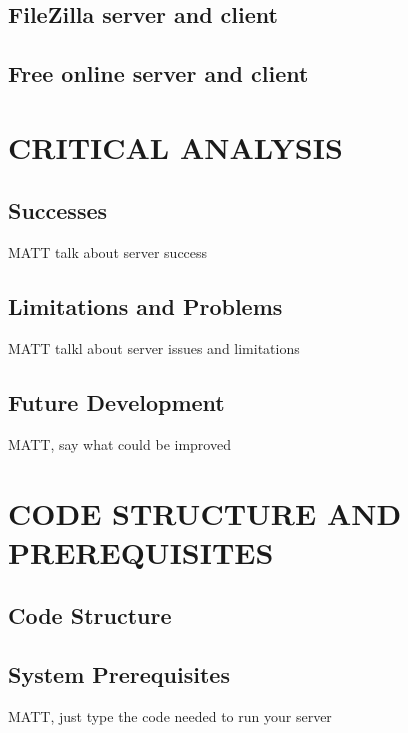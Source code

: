 \documentclass[10pt,twocolumn]{witseiepaper}
\begin{document}
\subsection{FileZilla server and client}
\label{sec: Results FileZilla}


\subsection{Free online server and client}
\label{sec: Results Online}


%
\section{CRITICAL ANALYSIS}
\label{sec: Critical Analysis}

\subsection{Successes}
\label{sec: Successes}
MATT talk about server success

\subsection{Limitations and Problems}
\label{sec: Limitations and Problems}
MATT talkl about server issues and limitations

\subsection{Future Development}
\label{sec: Future Development}
MATT, say what could be improved


%
\section{CODE STRUCTURE AND PREREQUISITES}
\label{sec: CODE STRUCTURE AND PREREQUISITES}


\subsection{Code Structure}
\label{sec: Code Structure}

\subsection{System Prerequisites}
\label{sec: System Prerequisites}
MATT, just type the code needed to run your server
\end{document}
